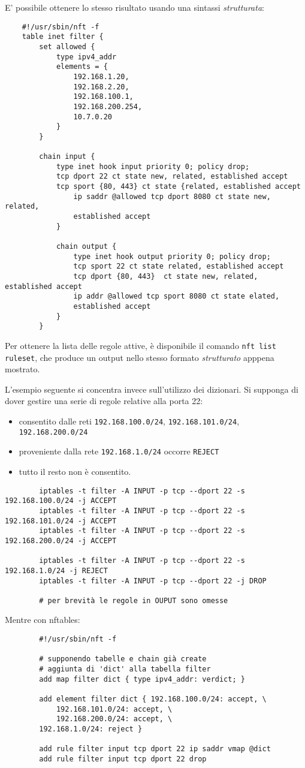 E' possibile ottenere lo stesso risultato usando una sintassi \textit{strutturata}:
\begin{verbatim}
	#!/usr/sbin/nft -f
	table inet filter {
		set allowed {
			type ipv4_addr
			elements = {
				192.168.1.20,
				192.168.2.20,
				192.168.100.1,
				192.168.200.254,
				10.7.0.20
			}
		}
		
		chain input {
			type inet hook input priority 0; policy drop;
			tcp dport 22 ct state new, related, established accept
			tcp sport {80, 443} ct state {related, established accept
				ip saddr @allowed tcp dport 8080 ct state new, related,
				established accept
			}
			
			chain output {
				type inet hook output priority 0; policy drop;
				tcp sport 22 ct state related, established accept
				tcp dport {80, 443}  ct state new, related, established accept
				ip addr @allowed tcp sport 8080 ct state elated,
				established accept
			}
		}
	\end{verbatim}
	Per ottenere la lista delle regole attive, è disponibile il comando
	\texttt{nft list ruleset}, che produce un output nello stesso formato \textit{strutturato}
	apppena mostrato.
	
	L'esempio seguente si concentra invece sull'utilizzo dei dizionari.
	Si supponga di dover gestire una serie di regole relative alla porta 22:
	\begin{itemize}
		\item consentito dalle reti \texttt{192.168.100.0/24}, \texttt{192.168.101.0/24},
		      \texttt{192.168.200.0/24}
		\item proveniente dalla rete \texttt{192.168.1.0/24} occorre \texttt{REJECT}
		\item tutto il resto non è consentito.
	\end{itemize}
	\begin{verbatim}
		iptables -t filter -A INPUT -p tcp --dport 22 -s 192.168.100.0/24 -j ACCEPT
		iptables -t filter -A INPUT -p tcp --dport 22 -s 192.168.101.0/24 -j ACCEPT
		iptables -t filter -A INPUT -p tcp --dport 22 -s 192.168.200.0/24 -j ACCEPT
		
		iptables -t filter -A INPUT -p tcp --dport 22 -s 192.168.1.0/24 -j REJECT
		iptables -t filter -A INPUT -p tcp --dport 22 -j DROP
		
		# per brevità le regole in OUPUT sono omesse
	\end{verbatim}
	Mentre con nftables:
	\begin{verbatim}
		#!/usr/sbin/nft -f
		
		# supponendo tabelle e chain già create
		# aggiunta di 'dict' alla tabella filter
		add map filter dict { type ipv4_addr: verdict; }
		
		add element filter dict { 192.168.100.0/24: accept, \
			192.168.101.0/24: accept, \
			192.168.200.0/24: accept, \
		192.168.1.0/24: reject }
		
		add rule filter input tcp dport 22 ip saddr vmap @dict
		add rule filter input tcp dport 22 drop
	\end{verbatim}
